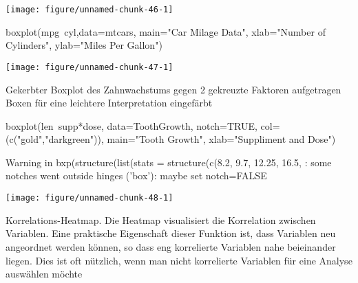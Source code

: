 \documentclass[a4paper,twoside]{tufte-book}\usepackage[]{graphicx}\usepackage[]{color}
\makeatletter
\def\maxwidth{ %
	\ifdim\Gin@nat@width>\linewidth
	\linewidth
	\else
	\Gin@nat@width
	\fi
}
\makeatother
\begin{document}
\begin{appendices}
\begin{Schunk}
{\centering \texttt{[image: figure/unnamed-chunk-46-1]} 

}

\end{Schunk}



\begin{Schunk}
\begin{Sinput}
boxplot(mpg~cyl,data=mtcars, main="Car Milage Data", 
   xlab="Number of Cylinders", ylab="Miles Per Gallon")
\end{Sinput}


{\centering \texttt{[image: figure/unnamed-chunk-47-1]} 

}

\end{Schunk}

Gekerbter Boxplot des Zahnwachstums gegen 2 gekreuzte Faktoren aufgetragen
Boxen für eine leichtere Interpretation eingefärbt

\begin{Schunk}
\begin{Sinput}
boxplot(len~supp*dose, data=ToothGrowth, notch=TRUE, 
  col=(c("gold","darkgreen")),
  main="Tooth Growth", xlab="Suppliment and Dose")
\end{Sinput}
\begin{Soutput}
Warning in bxp(structure(list(stats = structure(c(8.2, 9.7, 12.25, 16.5, : some notches went outside hinges ('box'): maybe set notch=FALSE
\end{Soutput}


{\centering \texttt{[image: figure/unnamed-chunk-48-1]} 

}

\end{Schunk}



Korrelations-Heatmap. Die Heatmap visualisiert die Korrelation zwischen Variablen. Eine praktische Eigenschaft dieser Funktion ist, dass Variablen neu angeordnet werden können, so dass eng korrelierte Variablen nahe beieinander liegen. Dies ist oft nützlich, wenn man nicht korrelierte Variablen für eine Analyse auswählen möchte


\end{appendices}
\end{document}
